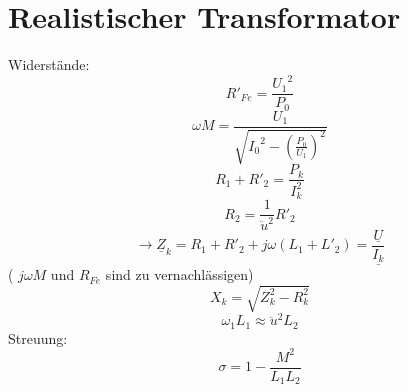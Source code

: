 \documentclass[12pt,a4paper]{article}
\begin{document}
\section{Realistischer Transformator}
Widerstände:
\[R'_{Fe} = \frac{{U_1}^2}{P_0}\]
\[\omega M = \frac{U_1}{\sqrt{{I_0}^2-(\frac{P_0}{U_1})^2}}\]
\[R_1+R'_2 = \frac{P_k}{I^2_k}\]
\[R_2 = \frac{1}{\ddot{u}^2}R'_2\]
\[\rightarrow \underline{Z}_k = R_1+R'_2+j\omega (L_1+L'_2)= \frac{\underline{U}}{\underline{I_k}}\] ( $j\omega M$ und $R_{Fe}$ sind zu vernachlässigen)
\[X_k = \sqrt{Z^2_k-R^2_k}\]
\[\omega_1 L_1 \approx \ddot{u}^2 L_2\]
Streuung:
\[\sigma = 1- \frac{M^2}{L_1 L_2}\]
\end{document}
